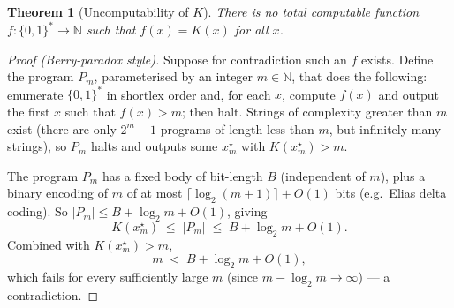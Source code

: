 \documentclass[12pt,a4paper]{article}
\theoremstyle{plain}
\newtheorem{theorem}{Theorem}[section]
\theoremstyle{definition}
\begin{document}
\begin{theorem}[Uncomputability of $K$]
\label{thm:uncomputable}
There is no total computable function $f : \{0,1\}^* \to \mathbb{N}$
such that $f(x) = K(x)$ for all $x$.
\end{theorem}

\begin{proof}[Proof (Berry-paradox style)]
Suppose for contradiction such an $f$ exists.  Define the program
$P_m$, parameterised by an integer $m \in \mathbb{N}$, that does the
following: enumerate $\{0,1\}^*$ in shortlex order and, for each $x$,
compute $f(x)$ and output the first $x$ such that $f(x) > m$; then
halt.  Strings of complexity greater than $m$ exist (there are only
$2^m - 1$ programs of length less than $m$, but infinitely many
strings), so $P_m$ halts and outputs some $x_m^\star$ with
$K(x_m^\star) > m$.

The program $P_m$ has a fixed body of bit-length $B$ (independent of
$m$), plus a binary encoding of $m$ of at most
$\lceil \log_2(m+1) \rceil + O(1)$ bits (e.g.\ Elias delta coding).
So $|P_m| \le B + \log_2 m + O(1)$, giving
\begin{equation}
  K(x_m^\star) \;\le\; |P_m| \;\le\; B + \log_2 m + O(1).
  \label{eq:berry-upper}
\end{equation}
Combined with $K(x_m^\star) > m$,
\begin{equation}
  m \;<\; B + \log_2 m + O(1),
  \label{eq:berry-contra}
\end{equation}
which fails for every sufficiently large $m$ (since $m - \log_2 m
\to \infty$) --- a contradiction.
\end{proof}
\end{document}
